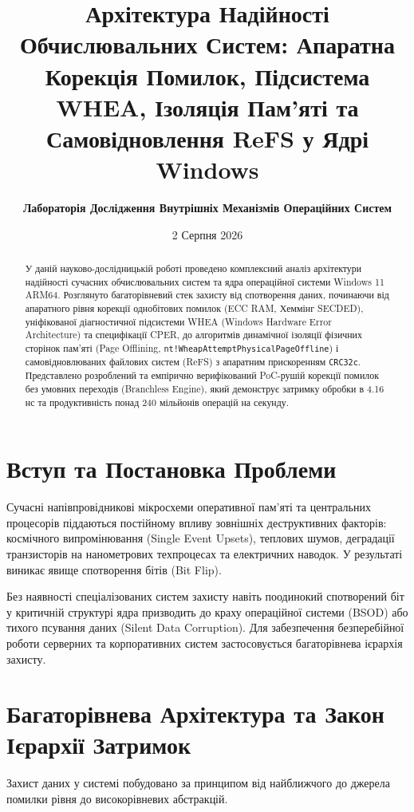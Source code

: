 \documentclass[12pt,a4paper]{article}
\title{\textbf{Архітектура Надійності Обчислювальних Систем: Апаратна Корекція Помилок, Підсистема WHEA, Ізоляція Пам'яті та Самовідновлення ReFS у Ядрі Windows}}
\author{\textbf{Лабораторія Дослідження Внутрішніх Механізмів Операційних Систем}}
\date{2 Серпня 2026}
\begin{document}
\maketitle

\begin{abstract}
У даній науково-дослідницькій роботі проведено комплексний аналіз архітектури надійності сучасних обчислювальних систем та ядра операційної системи Windows 11 ARM64. Розглянуто багаторівневий стек захисту від спотворення даних, починаючи від апаратного рівня корекції однобітових помилок (ECC RAM, Хеммінг SECDED), уніфікованої діагностичної підсистеми WHEA (Windows Hardware Error Architecture) та специфікації CPER, до алгоритмів динамічної ізоляції фізичних сторінок пам'яті (Page Offlining, \texttt{nt!WheapAttemptPhysicalPageOffline}) і самовідновлюваних файлових систем (ReFS) з апаратним прискоренням \texttt{CRC32c}. Представлено розроблений та емпірично верифікований PoC-рушій корекції помилок без умовних переходів (Branchless Engine), який демонструє затримку обробки в 4.16 нс та продуктивність понад 240 мільйонів операцій на секунду.
\end{abstract}

\tableofcontents
\newpage

\section{Вступ та Постановка Проблеми}
Сучасні напівпровідникові мікросхеми оперативної пам'яті та центральних процесорів піддаються постійному впливу зовнішніх деструктивних факторів: космічного випромінювання (Single Event Upsets), теплових шумов, деградації транзисторів на нанометрових техпроцесах та електричних наводок. У результаті виникає явище спотворення бітів (Bit Flip).

Без наявності спеціалізованих систем захисту навіть поодинокий спотворений біт у критичній структурі ядра призводить до краху операційної системи (BSOD) або тихого псування даних (Silent Data Corruption). Для забезпечення безперебійної роботи серверних та корпоративних систем застосовується багаторівнева ієрархія захисту.

\section{Багаторівнева Архітектура та Закон Ієрархії Затримок}

Захист даних у системі побудовано за принципом від найближчого до джерела помилки рівня до високорівневих абстракцій.
\end{document}
